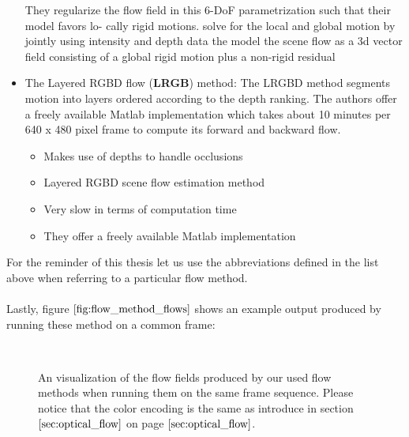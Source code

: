 \begin{itemize}
	
	They regularize the flow field in this 6-DoF parametrization such that their model favors lo- cally rigid motions.
	solve for the local and global motion by jointly using intensity and depth data
the model the scene flow as a 3d vector field consisting of a global rigid motion plus a non-rigid residual

	
	
\item The Layered RGBD flow (\textbf{LRGB}) method: The LRGBD method segments motion into layers ordered according to the depth ranking. The authors offer a freely available Matlab implementation which takes about 10 minutes per 640 x 480 pixel frame to compute its forward and backward flow.
	\begin{itemize}
	\item Makes use of depths to handle occlusions
	\item Layered RGBD scene flow estimation method
	\item Very slow in terms of computation time
	\item They offer a freely available Matlab implementation
	\end{itemize}
\end{itemize}
For the reminder of this thesis let us use the abbreviations defined in the list above when referring to a particular flow method. \\ \\
Lastly, figure $\ref{fig:flow_method_flows}$ shows an example output produced by running these method on a common frame:
\begin{figure}[H]
\begin{center}
~
\end{center}
\caption[Flow Method Flows]{An visualization of the flow fields produced by our used flow methods when running them on the same frame sequence. Please notice that the color encoding is the same as introduce in section $\ref{sec:optical_flow}$ on page $\pageref{sec:optical_flow}$.}
\label{fig:flow_method_flows}
\end{figure}


